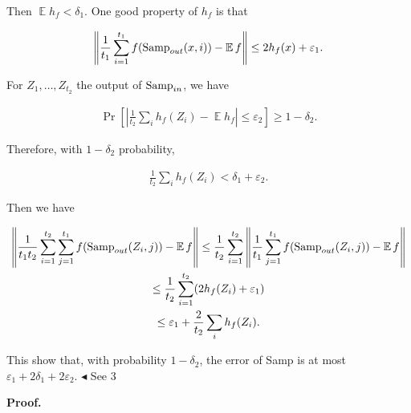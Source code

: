 Then $\operatorname*{\mathbb{E}}h_{f}<\delta_{1}$. One good property of $h_{f}$ is that\par


\[\begin{gathered}
\left\lVert\frac{1}{t_{1}}\sum_{i=1}^{t_{1}}f(\textup{{Samp}}_{out}(x,i))-\operatorname*{\mathbb{E}}f\right\rVert\leq 2h_{f}(x)+\varepsilon_{1}.
\end{gathered}\]


For $Z_{1},\dots,Z_{t_{2}}$ the output of $\textup{{Samp}}_{in}$, we have\par


\[\begin{gathered}
\Pr\left[\left|\frac{1}{t_{2}}\sum_{i}h_{f}(Z_{i})-\operatorname*{\mathbb{E}}h_{f}\right|\leq\varepsilon_{2}\right]\geq 1-\delta_{2}.
\end{gathered}\]


Therefore, with $1-\delta_{2}$ probability,\par


\[\begin{gathered}
{\frac{1}{t_{2}}\sum_{i}h_{f}(Z_{i})}<\delta_{1}+\varepsilon_{2}.
\end{gathered}\]


Then we have\par


\[\begin{gathered}
\displaystyle\left\lVert\frac{1}{t_{1}t_{2}}\sum_{i=1}^{t_{2}}\sum_{j=1}^{t_{1}}f(\textup{{Samp}}_{out}(Z_{i},j))-\operatorname*{\mathbb{E}}f\right\rVert \displaystyle\leq\frac{1}{t_{2}}\sum_{i=1}^{t_{2}}\left\lVert\frac{1}{t_{1}}\sum_{j=1}^{t_{1}}f(\textup{{Samp}}_{out}(Z_{i},j))-\operatorname*{\mathbb{E}}f\right\rVert \\
\displaystyle\leq\frac{1}{t_{2}}\sum_{i=1}^{t_{2}}(2h_{f}(Z_{i})+\varepsilon_{1}) \\
\displaystyle\leq\varepsilon_{1}+{\frac{2}{t_{2}}\sum_{i}h_{f}(Z_{i})}.
\end{gathered}\]


This show that, with probability $1-\delta_{2}$, the error of Samp is at most $\varepsilon_{1}+2\delta_{1}+2\varepsilon_{2}$.
$\blacktriangleleft$
See 3\par





\par\medskip\noindent\textbf{Proof.}\par




